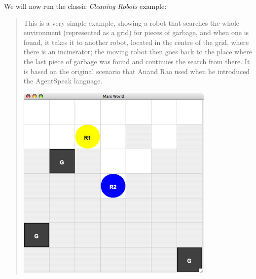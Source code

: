 \documentclass[a4paper]{article}
\begin{document}
We will now run the classic \emph{Cleaning Robots} example:
\begin{quote}
  This is a very simple example, showing a robot that searches the
  whole environment (represented as a grid) for pieces of garbage, and
  when one is found, it takes it to another robot, located in the
  centre of the grid, where there is an incinerator; the moving robot
  then goes back to the place where the last piece of garbage was
  found and continues the search from there. It is based on the
  original scenario that Anand Rao used when he introduced the
  AgentSpeak language.
  
  \includegraphics{figures/JasonEx-CR-ss1.png}
\end{quote}
\end{document}
